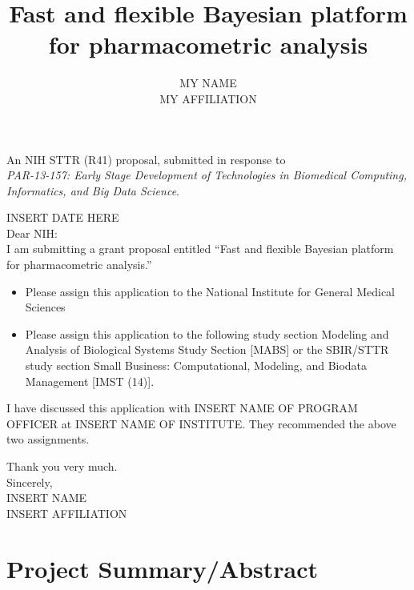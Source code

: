 \documentclass[11pt]{article}
\title{Fast and flexible Bayesian platform for pharmacometric analysis}
\author{MY NAME\\
MY AFFILIATION}
\begin{document}
\maketitle

\begin{center}
An NIH STTR (R41) proposal, submitted in response to \\
{\em PAR-13-157: Early Stage Development of Technologies in Biomedical Computing, Informatics, and Big Data Science}.
\end{center}

\clearpage

\noindent
INSERT DATE HERE\\[2ex]

\noindent
Dear NIH:\\[1ex]

I am submitting a grant proposal entitled ``Fast and flexible Bayesian platform for pharmacometric analysis.''

\begin{itemize}
\item Please assign this application to the National Institute for
  General Medical Sciences
\item Please assign this application to the following study section
  Modeling and Analysis of Biological Systems Study Section [MABS] or
  the SBIR/STTR study section Small Business: Computational, Modeling, and Biodata Management [IMST (14)].
\end{itemize}
I have discussed this application with INSERT NAME OF PROGRAM OFFICER
at INSERT NAME OF INSTITUTE.  They recommended the above two
assignments.

Thank you very much.\\[1ex]
 
\noindent
Sincerely,\\[2ex]

\noindent
INSERT NAME\\
INSERT AFFILIATION


\clearpage
\section*{Project Summary/Abstract}
\end{document}
